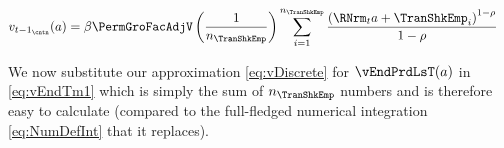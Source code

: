 \lstset{basicstyle=\ttfamily\footnotesize,breaklines=true,language=Python,frame=single}
\nopagebreak

  \begin{equation}\begin{gathered}\begin{aligned}
        v_{{t-1}_\cntn}(a)  & =   \beta \PermGroFacAdjV\left(\frac{1}{n_{\TranShkEmp}}\right)\sum_{i=1}^{n_{\TranShkEmp}}   \frac{\left(\RNrm_{t} a + \TranShkEmp_{i}\right)^{1-\rho}}{1-\rho} \label{eq:vDiscrete}
      \end{aligned}\end{gathered}\end{equation}

We now substitute our approximation \eqref{eq:vDiscrete} for $\vEndPrdLsT(a)$ in \eqref{eq:vEndTm1} which is simply the sum of $n_{\TranShkEmp}$ numbers and is therefore easy to calculate (compared to the full-fledged numerical integration \eqref{eq:NumDefInt} that it replaces).




\begin{comment}
  In the {\SMDSOPntbk} notebook, the section ``Discretization of the Income Shock Distribution'' provides code that instantiates the \texttt{DiscreteApproximation} class defined in the \texttt{resources} module. This class creates a 7-point discretization of the continuous log-normal distribution of transitory shocks to income by utilizing seven points, where the mean value is $-.5 \sigma^2$, and the standard deviation is $\sigma = .5$.

  A close look at the \texttt{DiscreteApproximation} class and its subclasses should convince you that the code is simply a computational implementation of the mathematical description of equiprobable discrete approximation in this section. Moreover, the Python code generates a graph of the discretized distribution depicted in \ref{fig:discreteapprox}.
\end{comment}

